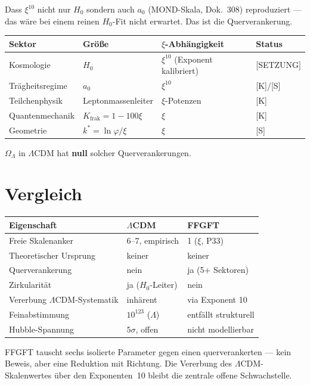 Dass $\xi^{10}$ nicht nur $H_0$ sondern auch $a_0$ (MOND-Skala,
Dok.~308) reproduziert — das wäre bei einem reinen $H_0$-Fit nicht
erwartet. Das ist die Querverankerung.

\begin{center}
\begin{tabular}{llll}
\toprule
Sektor & Größe & $\xi$-Abhängigkeit & Status \\
\midrule
Kosmologie & $H_0$ & $\xi^{10}$ (Exponent kalibriert) & [SETZUNG] \\
Trägheitsregime & $a_0$ & $\xi^{10}$ & [K]/[S] \\
Teilchenphysik & Leptonmassenleiter & $\xi$-Potenzen & [K] \\
Quantenmechanik & $K_\text{frak} = 1-100\xi$ & $\xi$ & [K] \\
Geometrie & $k^* = \ln\varphi/\xi$ & $\xi$ & [S] \\
\bottomrule
\end{tabular}
\end{center}

$\Omega_\Lambda$ in $\Lambda$CDM hat \textbf{null} solcher Querverankerungen.

\chapter{Vergleich}

\begin{center}
\begin{tabular}{lll}
\toprule
Eigenschaft & $\Lambda$CDM & FFGFT \\
\midrule
Freie Skalenanker & 6–7, empirisch & 1 ($\xi$, P33) \\
Theoretischer Ursprung & keiner & keiner \\
Querverankerung & nein & ja (5+ Sektoren) \\
Zirkularität & ja ($H_0$-Leiter) & nein \\
Vererbung $\Lambda$CDM-Systematik & inhärent & via Exponent 10 \\
Feinabstimmung & $10^{123}$ ($\Lambda$) & entfällt strukturell \\
Hubble-Spannung & $5\sigma$, offen & nicht modellierbar \\
\bottomrule
\end{tabular}
\end{center}

\medskip
FFGFT tauscht sechs isolierte Parameter gegen einen querverankerten —
kein Beweis, aber eine Reduktion mit Richtung. Die Vererbung des
$\Lambda$CDM-Skalenwertes über den Exponenten~10 bleibt die
zentrale offene Schwachstelle.

